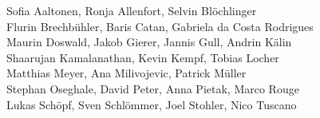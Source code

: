 %
%
%
Sofia Aaltonen,		%
Ronja Allenfort,	%
Selvin Blöchlinger%
\\
Flurin Brechbühler,	%
Baris Catan,		%
Gabriela da Costa Rodrigues%
\\
Maurin Doswald,		%
Jakob Gierer,		%
Jannis Gull,		%
Andrin Kälin%
\\
Shaarujan Kamalanathan,	%
Kevin Kempf,		%
Tobias Locher%
\\
Matthias Meyer,		%
Ana Milivojevic,	%
Patrick Müller%
\\
Stephan Oseghale,	%
David Peter,		%
Anna Pietak,		%
Marco Rouge%
\\
Lukas Schöpf,		%
Sven Schlömmer,		%
Joel Stohler,		%
Nico Tuscano%
